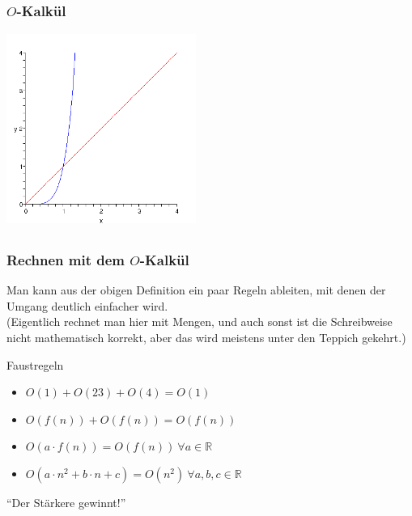 \subsection*{}
\begin{frame}
  \frametitle{$O$-Kalkül}
    \begin{center}
			\includegraphics[height=6.2cm]{src/tut08_okalk.png} %
		\end{center}
\end{frame}

\subsection*{}
\begin{frame}
  \frametitle{Rechnen mit dem $O$-Kalkül}

\begin{small}  Man kann aus der obigen Definition ein paar Regeln ableiten, mit denen der Umgang deutlich einfacher wird.\\
  (Eigentlich rechnet man hier mit Mengen, und auch sonst ist die Schreibweise nicht mathematisch
  korrekt, aber das wird meistens unter den Teppich gekehrt.)\end{small}

  \begin{block}{Faustregeln}
    \begin{itemize}%
      \item $O(1) + O(23) + O(4) = O(1)$
      \item $O( f(n) ) + O( f(n) ) = O( f(n) )$
      \item $O( a\cdot f(n) ) = O(f(n)) \ \forall a\in\mathbb{R}$
      \item $O( a\cdot n^2+b\cdot n+c ) = O( n^2 ) \ \forall a,b,c\in\mathbb{R}$
    \end{itemize}

    \begin{center}"`Der Stärkere gewinnt!"'\end{center}
  \end{block}
\end{frame}

